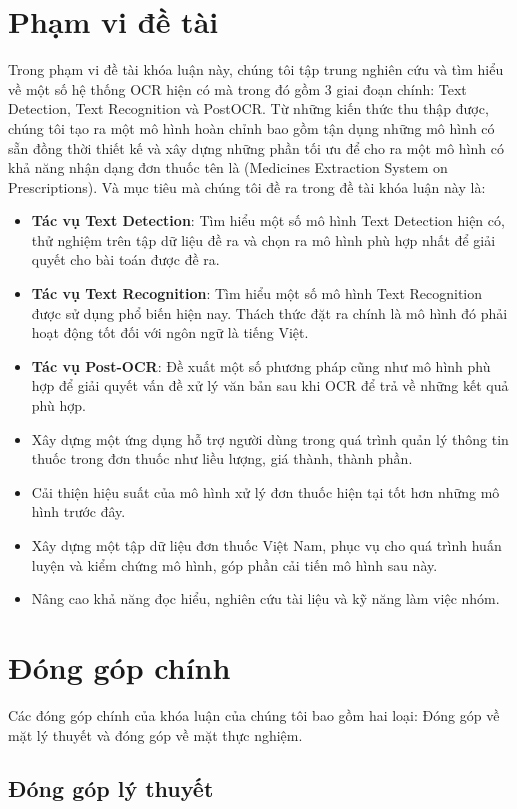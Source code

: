 \section{Phạm vi đề tài}

Trong phạm vi đề tài khóa luận này, chúng tôi tập trung nghiên cứu và tìm hiểu về một số hệ
thống OCR \cite{impedovo1991optical} hiện có mà trong đó gồm 3 giai đoạn chính: Text Detection, Text Recognition và PostOCR. Từ những kiến thức thu thập được, chúng tôi tạo ra một mô hình hoàn chỉnh bao gồm tận dụng những mô hình có sẵn đồng thời thiết kế và xây dựng những phần tối ưu để cho ra một mô hình có khả năng nhận dạng đơn thuốc tên là  (Medicines Extraction System on
Prescriptions). Và mục tiêu mà chúng tôi đề ra trong đề tài khóa luận này là:
\begin{itemize}
    \item \textbf{Tác vụ Text Detection}: Tìm hiểu một số mô hình Text Detection hiện có, thử nghiệm
trên tập dữ liệu đề ra và chọn ra mô hình phù hợp nhất để giải quyết cho bài toán
được đề ra.
\item \textbf{Tác vụ Text Recognition}: Tìm hiểu một số mô hình Text Recognition được sử dụng
phổ biến hiện nay. Thách thức đặt ra chính là mô hình đó phải hoạt động tốt đối với
ngôn ngữ là tiếng Việt.
\item \textbf{Tác vụ Post-OCR}: Đề xuất một số phương pháp cũng như mô hình phù hợp để giải
quyết vấn đề xử lý văn bản sau khi OCR để trả về những kết quả phù hợp.
\item Xây dựng một ứng dụng hỗ trợ người dùng trong quá trình quản lý thông tin thuốc
trong đơn thuốc như liều lượng, giá thành, thành phần.
\item Cải thiện hiệu suất của mô hình xử lý đơn thuốc hiện tại tốt hơn những mô hình
trước đây.
\item Xây dựng một tập dữ liệu đơn thuốc Việt Nam, phục vụ cho quá trình huấn luyện và
kiểm chứng mô hình, góp phần cải tiến mô hình sau này.
\item Nâng cao khả năng đọc hiểu, nghiên cứu tài liệu và kỹ năng làm việc nhóm.
\end{itemize}
\section{Đóng góp chính}

Các đóng góp chính của khóa luận của chúng tôi bao gồm hai loại: Đóng góp về mặt lý
thuyết và đóng góp về mặt thực nghiệm.

\subsection{Đóng góp lý thuyết}

